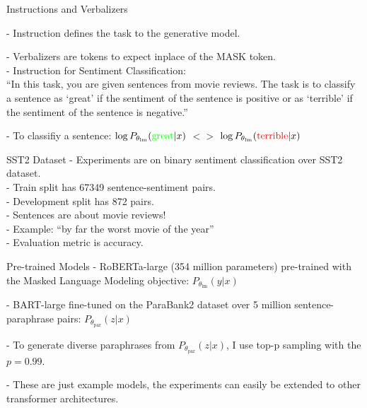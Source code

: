 \documentclass{beamer}
\begin{document}
\begin{frame}{Instructions and Verbalizers}

- Instruction defines the task to the generative model.\\
\medskip
\medskip
\medskip

- Verbalizers are tokens to expect inplace of the MASK token.\\
\medskip\medskip\medskip
- Instruction for Sentiment Classification:\\
{\color{purple}“In this task, you are given sentences from movie
reviews. The task is to classify a sentence as ‘great’ if
the sentiment of the sentence is positive or as ‘terrible’
if the sentiment of the sentence is negative.”}
\medskip\medskip\medskip

- To classifiy a sentence:
$\log P_{\theta_{\text{lm}}} (\text{{\color{green}great}}| x)$ $<>$ $\log P_{\theta_{\text{lm}}} ({\color{red}\text{terrible}}| x)$
\end{frame}

\begin{frame}{SST2 Dataset}
- Experiments are on binary sentiment classification over SST2 dataset. \\
\medskip\medskip
- Train split has 67349 sentence-sentiment pairs. \\
\medskip\medskip
- Development split has 872 pairs. \\
\medskip\medskip
- Sentences are about movie reviews! \\
\medskip\medskip
- Example: {\color{orange}``by far the worst movie of the year''}\\
\medskip\medskip
- Evaluation metric is accuracy.
\end{frame}

\begin{frame}{Pre-trained Models}
- RoBERTa-large (354 million parameters) pre-trained with the Masked Language Modeling objective: $P_{\theta_{\text{lm}}} (y | x)$\\

\medskip \medskip

- BART-large fine-tuned on the ParaBank2 dataset over 5 million sentence-paraphrase pairs: $P_{\theta_{\text{par}}} (z | x)$\\

\medskip \medskip

- To generate diverse paraphrases from $P_{\theta_{\text{par}}} (z | x)$, I use top-p sampling with the $p=0.99$.

\medskip \medskip
- These are just example models, the experiments can easily be extended to other transformer architectures.

\end{frame}
\end{document}
